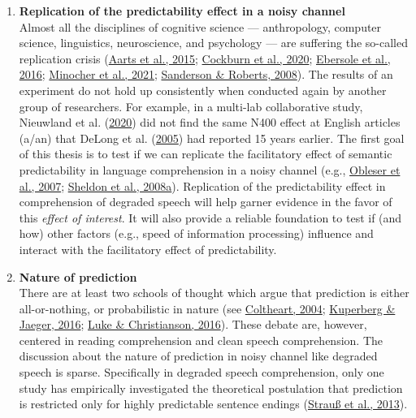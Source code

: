 \documentclass[a4paper, nobind]{templates/ociamthesis}
\begin{document}
\begin{enumerate}
\def\labelenumi{(\arabic{enumi})}
\item
  \textbf{Replication of the predictability effect in a noisy channel}\\
  Almost all the disciplines of cognitive science --- anthropology, computer science, linguistics, neuroscience, and psychology --- are suffering the so-called replication crisis (\protect\hyperlink{ref-OSC2015}{Aarts et al., 2015}; \protect\hyperlink{ref-Cockburn2020}{Cockburn et al., 2020}; \protect\hyperlink{ref-Ebersole2016}{Ebersole et al., 2016}; \protect\hyperlink{ref-Minocher2021}{Minocher et al., 2021}; \protect\hyperlink{ref-Sanderson2008}{Sanderson \& Roberts, 2008}).
  The results of an experiment do not hold up consistently when conducted again by another group of researchers.
  For example, in a multi-lab collaborative study, Nieuwland et al. (\protect\hyperlink{ref-Nieuwland2020a}{2020}) did not find the same N400 effect at English articles (a/an) that DeLong et al. (\protect\hyperlink{ref-Delong2005}{2005}) had reported 15 years earlier.
  The first goal of this thesis is to test if we can replicate the facilitatory effect of semantic predictability in language comprehension in a noisy channel (e.g., \protect\hyperlink{ref-Obleser2007}{Obleser et al., 2007}; \protect\hyperlink{ref-Sheldon2008a}{Sheldon et al., 2008a}).
  Replication of the predictability effect in comprehension of degraded speech
  will help garner evidence in the favor of this \emph{effect of interest}.
  It will also provide a reliable foundation to test if (and how) other factors (e.g., speed of information processing) influence and interact with the facilitatory effect of predictability.
\item
  \textbf{Nature of prediction}\\
  There are at least two schools of thought which argue that prediction is either all-or-nothing, or probabilistic in nature (see \protect\hyperlink{ref-Coltheart2004}{Coltheart, 2004}; \protect\hyperlink{ref-Kuperberg2016}{Kuperberg \& Jaeger, 2016}; \protect\hyperlink{ref-Luke2016}{Luke \& Christianson, 2016}).
  These debate are, however, centered in reading comprehension and clean speech comprehension.
  The discussion about the nature of prediction in noisy channel like degraded speech is sparse.
  Specifically in degraded speech comprehension, only one study has empirically investigated the theoretical postulation that prediction is restricted only for highly predictable sentence endings (\protect\hyperlink{ref-Strauss2013}{Strauß et al., 2013}).

\end{enumerate}
\end{document}

